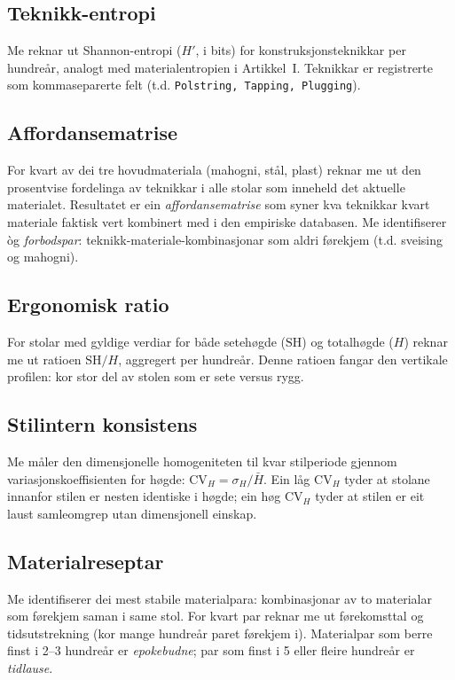 \documentclass[10pt, a4paper, twocolumn]{article}
\begin{document}
\subsection{Teknikk-entropi}

Me reknar ut Shannon-entropi ($H'$, i bits) for konstruksjonsteknikkar per hundreår, analogt med materialentropien i Artikkel~I. Teknikkar er registrerte som kommaseparerte felt (t.d. \texttt{Polstring, Tapping, Plugging}).

\subsection{Affordansematrise}

For kvart av dei tre hovudmateriala (mahogni, stål, plast) reknar me ut den prosentvise fordelinga av teknikkar i alle stolar som inneheld det aktuelle materialet. Resultatet er ein \emph{affordansematrise} som syner kva teknikkar kvart materiale faktisk vert kombinert med i den empiriske databasen. Me identifiserer òg \emph{forbodspar}: teknikk-materiale-kombinasjonar som aldri førekjem (t.d. sveising og mahogni).

\subsection{Ergonomisk ratio}

For stolar med gyldige verdiar for både setehøgde ($\text{SH}$) og totalhøgde ($H$) reknar me ut ratioen $\text{SH}/H$, aggregert per hundreår. Denne ratioen fangar den vertikale profilen: kor stor del av stolen som er sete versus rygg.

\subsection{Stilintern konsistens}

Me måler den dimensjonelle homogeniteten til kvar stilperiode gjennom variasjonskoeffisienten for høgde: $\text{CV}_H = \sigma_H / \bar{H}$. Ein låg $\text{CV}_H$ tyder at stolane innanfor stilen er nesten identiske i høgde; ein høg $\text{CV}_H$ tyder at stilen er eit laust samleomgrep utan dimensjonell einskap.

\subsection{Materialreseptar}

Me identifiserer dei mest stabile materialpara: kombinasjonar av to materialar som førekjem saman i same stol. For kvart par reknar me ut førekomsttal og tidsutstrekning (kor mange hundreår paret førekjem i). Materialpar som berre finst i 2--3 hundreår er \emph{epokebudne}; par som finst i 5 eller fleire hundreår er \emph{tidlause}.
\end{document}
